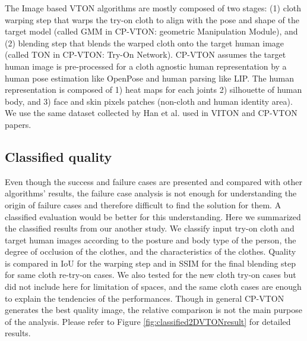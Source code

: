 \documentclass[runningheads]{llncs}
\begin{document}
The Image based VTON algorithms are mostly composed of two stages: (1) cloth warping step that warps the try-on cloth to align with the pose and shape of the target model (called GMM in CP-VTON: geometric Manipulation Module)\cite{Wang2018TowardCI}, and (2) blending step that blends the warped cloth onto the target human image (called TON in CP-VTON: Try-On Network)\cite{Wang2018TowardCI}. CP-VTON assumes the target human image is pre-processed for a cloth agnostic human representation by a human pose estimation like OpenPose\cite{Cao2018OpenPoseRM} and human parsing like LIP\cite{Liang2018LookIP}. The human representation is composed of 1) heat maps for each joints 2) silhouette of human body, and 3) face and skin pixels patches (non-cloth and human identity area). We use the same dataset collected by Han et al. used in VITON\cite{Han2017VITONAI} and CP-VTON\cite{Wang2018TowardCI} papers.
 

\subsection{Classified quality}

Even though the success and failure cases are presented and compared with other algorithms' results, the failure case analysis is not enough for understanding the origin of failure cases and therefore difficult to find the solution for them. A classified evaluation would be better for this understanding. Here we summarized the classified results from our another study. We classify input try-on cloth and target human images according to the posture and body type of the person, the degree of occlusion of the clothes, and the characteristics of the clothes. Quality is compared in IoU for the warping step and in SSIM for the final blending step for same cloth re-try-on cases. We also tested for the new cloth try-on cases but did not include here for limitation of spaces, and the same cloth cases are enough to explain the tendencies of the performances. Though in general CP-VTON generates the best quality image, the relative comparison is not the main purpose of the analysis. Please refer to Figure \ref{fig:classified2DVTONresult} for detailed results.
\end{document}

